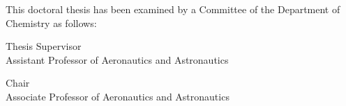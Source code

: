 %
%
%

\begin{titlepage}
\begin{large}
This doctoral thesis has been examined by a Committee of the Department
of Chemistry as follows:

\signature{Professor Warren Hoburg}{Thesis Supervisor \\
    Assistant Professor of Aeronautics and Astronautics}

\signature{Youssef M. Marzouk}{Chair \\
    Associate Professor of Aeronautics and Astronautics}

\end{large}
\end{titlepage}

